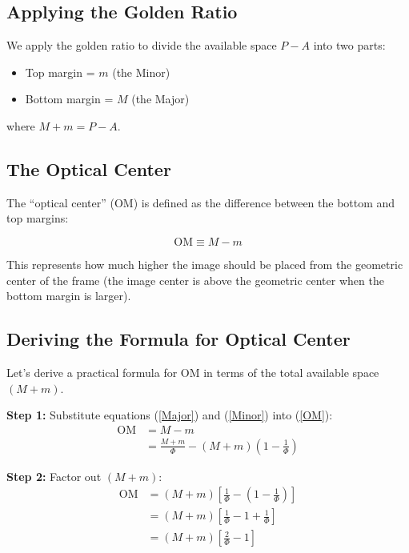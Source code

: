\documentclass[12pt,a4paper]{article}
\begin{document}
\subsection{Applying the Golden Ratio}

We apply the golden ratio to divide the available space $P - A$ into two parts:

\begin{itemize}
    \item Top margin = $m$ (the Minor)
    \item Bottom margin = $M$ (the Major)
\end{itemize}

where $M + m = P - A$.

\subsection{The Optical Center}

The ``optical center'' (OM) is defined as the difference between the bottom and top margins:

\begin{equation}
  \text{OM} \equiv M - m
  \label{OM}
\end{equation}

This represents how much higher the image should be placed from the geometric center of the frame (the image center is above the geometric center when the bottom margin is larger).

\subsection{Deriving the Formula for Optical Center}

Let's derive a practical formula for OM in terms of the total available space $(M + m)$.

\textbf{Step 1:} Substitute equations (\ref{Major}) and (\ref{Minor}) into (\ref{OM}):
\begin{align}
  \text{OM} &= M - m \\
  &= \frac{M + m}{\Phi} - (M + m)\left(1 - \frac{1}{\Phi}\right)
\end{align}

\textbf{Step 2:} Factor out $(M + m)$:
\begin{align}
  \text{OM} &= (M + m)\left[\frac{1}{\Phi} - \left(1 - \frac{1}{\Phi}\right)\right] \\
  &= (M + m)\left[\frac{1}{\Phi} - 1 + \frac{1}{\Phi}\right] \\
  &= (M + m)\left[\frac{2}{\Phi} - 1\right]
\end{align}
\end{document}
